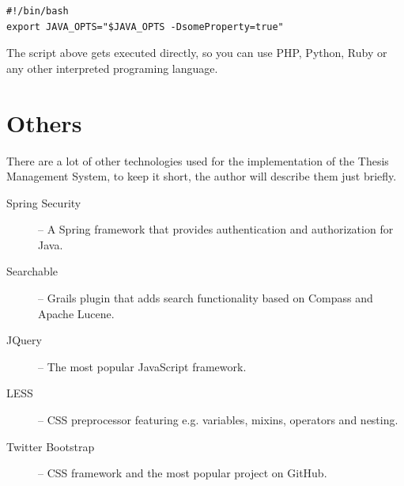 \begin{verbatim}
#!/bin/bash
export JAVA_OPTS="$JAVA_OPTS -DsomeProperty=true"
\end{verbatim}

The script above gets executed directly, so you can use PHP, Python, Ruby or any other interpreted programing language.

\section{Others}

There are a lot of other technologies used for the implementation of the Thesis Management System, to keep it short, the author will describe them just briefly.

\begin{description}
    \item[Spring Security] -- A Spring framework that provides authentication and authorization for Java.
    \item[Searchable] -- Grails plugin that adds search functionality based on Compass and Apache Lucene\cite{searchable-documentation}.
    \item[JQuery] -- The most popular JavaScript framework.
    \item[LESS] -- CSS preprocessor featuring e.g. variables, mixins, operators and nesting.
    \item[Twitter Bootstrap] -- CSS framework and the most popular project on GitHub.
\end{description}

